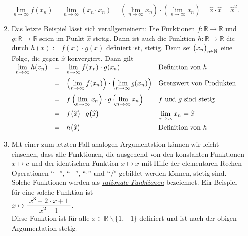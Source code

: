 \begin{enumerate}
      $\lim\limits_{n\rightarrow\infty} f(x_n) = 
       \lim\limits_{n\rightarrow\infty} (x_n \cdot x_n) = 
       \left(\lim\limits_{n\rightarrow\infty} x_n\right) \cdot\left(\lim\limits_{n\rightarrow\infty} x_n\right) =
       \widehat{x} \cdot \widehat{x} = \widehat{x}^2$.
\item Das letzte Beispiel l\"asst sich verallgemeinern: Die Funktionen
      $f:\mathbb{R} \rightarrow \mathbb{R}$ und $g:\mathbb{R} \rightarrow \mathbb{R}$
      seien im Punkt $\widehat{x}$ stetig.  Dann ist auch die Funktion
      $h: \mathbb{R} \rightarrow \mathbb{R}$ die durch $h(x) := f(x) \cdot g(x)$
      definiert ist, stetig.  Denn sei $\bigl(x_n\bigr)_{n\in\mathbb{N}}$ eine Folge, die gegen $\widehat{x}$
      konvergiert.  Dann gilt
      \\[0.2cm]
      \hspace*{1.3cm}      
      $
      \begin{array}[t]{lcll}
            \lim\limits_{n\rightarrow\infty} h(x_n) 
      & = & \lim\limits_{n\rightarrow\infty} f(x_n) \cdot g(x_n) & \mbox{Definition von $h$} \\[0.3cm] 
      & = & \left(\lim\limits_{n\rightarrow\infty} f(x_n)\right) \cdot \left(\lim\limits_{n\rightarrow\infty} g(x_n)\right) &
            \mbox{Grenzwert von Produkten} \\[0.3cm] 
      & = & f\left(\lim\limits_{n\rightarrow\infty} x_n\right) \cdot g\left(\lim\limits_{n\rightarrow\infty} x_n\right) &
            \mbox{$f$ und $g$ sind stetig} \\[0.3cm] 
      & = & f\bigr(\widehat{x}\bigr) \cdot g\bigr(\widehat{x}\bigr) &
            \lim\limits_{n\rightarrow\infty} x_n = \widehat{x} \\[0.3cm] 
      & = & h\bigl(\widehat{x}\bigr) & \mbox{Definition von $h$}
      \end{array}
      $
      
\item Mit einer zum letzten Fall analogen Argumentation k\"onnen wir leicht einsehen, dass alle Funktionen,
      die ausgehend von den konstanten Funktionen $x \mapsto c$ und der identischen
      Funktion $x \mapsto x$ mit Hilfe der elementaren Rechen-Operationen 
      ``$+$'', ``$-$'', ``$\cdot $'' und ``$/$'' gebildet werden k\"onnen, stetig sind.  Solche
      Funktionen werden als \href{http://de.wikipedia.org/wiki/Rationale_Funktion}{\emph{rationale Funktionen}} bezeichnet.
      Ein       Beispiel f\"ur eine solche Funktion ist 
      \\[0.2cm]
      \hspace*{1.3cm}      
      $x \mapsto \displaystyle\frac{\;\displaystyle x^3 - 2\cdot x +1\;}{\;\displaystyle x^2 -1\;}$.
      \\[0.2cm]
      Diese Funktion ist f\"ur alle $x\in\mathbb{R} \backslash \{1,-1\}$ definiert und ist
      nach der obigen Argumentation stetig.



\end{enumerate}
